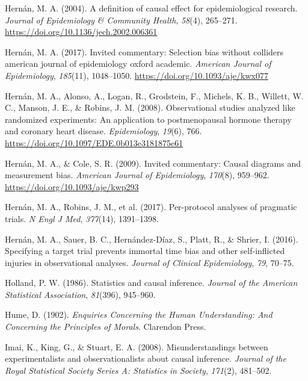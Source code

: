 \documentclass[
  single column]{article}
\newlength{\cslhangindent}
\newenvironment{CSLReferences}[2] %
 {\begin{list}{}{%
  \setlength{\itemindent}{0pt}
  \setlength{\leftmargin}{0pt}
  \setlength{\parsep}{0pt}
  \ifodd #1
   \setlength{\leftmargin}{\cslhangindent}
   \setlength{\itemindent}{-1\cslhangindent}
  \fi
  \setlength{\itemsep}{#2\baselineskip}}}
 {\end{list}}
\begin{document}
\begin{CSLReferences}{1}{0}
Hernán, M. A. (2004). A definition of causal effect for epidemiological
research. \emph{Journal of Epidemiology \& Community Health},
\emph{58}(4), 265--271. \url{https://doi.org/10.1136/jech.2002.006361}

Hernán, M. A. (2017). Invited commentary: Selection bias without
colliders \textbar{} american journal of epidemiology \textbar{} oxford
academic. \emph{American Journal of Epidemiology}, \emph{185}(11),
1048--1050. \url{https://doi.org/10.1093/aje/kwx077}

Hernán, M. A., Alonso, A., Logan, R., Grodstein, F., Michels, K. B.,
Willett, W. C., Manson, J. E., \& Robins, J. M. (2008). Observational
studies analyzed like randomized experiments: An application to
postmenopausal hormone therapy and coronary heart disease.
\emph{Epidemiology}, \emph{19}(6), 766.
\url{https://doi.org/10.1097/EDE.0b013e3181875e61}

Hernán, M. A., \& Cole, S. R. (2009). Invited commentary: Causal
diagrams and measurement bias. \emph{American Journal of Epidemiology},
\emph{170}(8), 959--962. \url{https://doi.org/10.1093/aje/kwp293}

Hernán, M. A., Robins, J. M., et al. (2017). Per-protocol analyses of
pragmatic trials. \emph{N Engl J Med}, \emph{377}(14), 1391--1398.

Hernán, M. A., Sauer, B. C., Hernández-Díaz, S., Platt, R., \& Shrier,
I. (2016). Specifying a target trial prevents immortal time bias and
other self-inflicted injuries in observational analyses. \emph{Journal
of Clinical Epidemiology}, \emph{79}, 70--75.

Holland, P. W. (1986). Statistics and causal inference. \emph{Journal of
the American Statistical Association}, \emph{81}(396), 945--960.

Hume, D. (1902). \emph{Enquiries Concerning the Human Understanding: And
Concerning the Principles of Morals}. Clarendon Press.

Imai, K., King, G., \& Stuart, E. A. (2008). Misunderstandings between
experimentalists and observationalists about causal inference.
\emph{Journal of the Royal Statistical Society Series A: Statistics in
Society}, \emph{171}(2), 481--502.


\end{CSLReferences}
\end{document}
